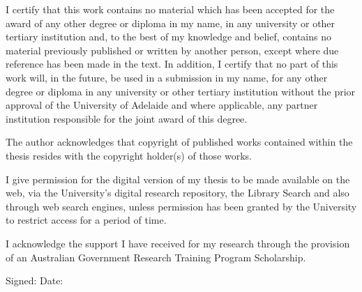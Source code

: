 {%
%
%
I certify that this work contains no material which has been accepted for the award of any other degree or diploma in my name, in any university or other tertiary institution and, to the best of my knowledge and belief, contains no material previously published or written by another person, except where due reference has been made in the text. In addition, I certify that no part of this work will, in the future, be used in a submission in my name, for any other degree or diploma in any university or other tertiary institution without the prior approval of the University of Adelaide and where applicable, any partner institution responsible for the joint award of this degree.

The author acknowledges that copyright of published works contained within the thesis resides with the copyright holder(s) of those works.

I give permission for the digital version of my thesis to be made available on the web, via the University's digital research repository, the Library Search and also through web search engines, unless permission has been granted by the University to restrict access for a period of time.

I acknowledge the support I have received for my research through the provision of an Australian Government Research Training Program Scholarship. 

Signed: \dotfill\quad 
Date: \dotfill

}